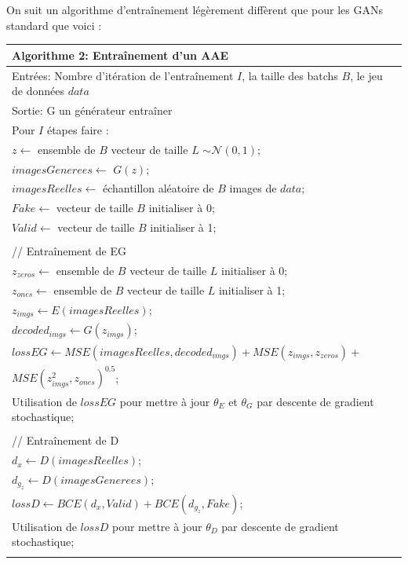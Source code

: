 \documentclass[11pt,francais]{article}
\begin{document}
On suit un algorithme d'entraînement légèrement diffèrent que pour les GANs standard que voici :\\
\newpage
\begin{table}[t!]
  \begin{tabular}{l}
  \hline
  Algorithme 2: Entraînement d'un AAE\tabularnewline
  \hline
  Entrées: Nombre d'itération de l'entraînement  \(I\), la taille des batchs \(B\), le jeu de données \(data\)  \tabularnewline
  Sortie: G un générateur entraîner \tabularnewline
  \hline
  Pour \(I\) étapes faire :\tabularnewline 
  \hspace{1cm}\(z \leftarrow\) ensemble de \(B\) vecteur de taille \(L\) \(\sim \mathcal{N}(0,1)\);\tabularnewline
  \hspace{1cm}\(imagesGenerees \leftarrow\) \(G(z)\);\tabularnewline  
  \hspace{1cm}\(imagesReelles \leftarrow\) échantillon aléatoire de \(B\) images de \(data\);\tabularnewline
  \hspace{1cm}\(Fake \leftarrow\) vecteur de taille \(B\) initialiser à 0;\tabularnewline
  \hspace{1cm}\(Valid \leftarrow\) vecteur de taille \(B\) initialiser à 1;\tabularnewline
  \tabularnewline
  
  \hspace{1cm}// Entraînement de EG\tabularnewline
  \hspace{1cm}\(z_{zeros} \leftarrow\) ensemble de \(B\) vecteur de taille \(L\) initialiser à 0;\tabularnewline
  \hspace{1cm}\(z_{ones} \leftarrow\) ensemble de \(B\) vecteur de taille \(L\) initialiser à 1;\tabularnewline
  \hspace{1cm}\(z_{imgs} \leftarrow E(imagesReelles)\);\tabularnewline
  \hspace{1cm}\(decoded_{imgs} \leftarrow G(z_{imgs})\);\tabularnewline
  \hspace{1cm}\(lossEG \leftarrow MSE(imagesReelles, decoded_{imgs}) + MSE(z_{imgs}, z_{zeros}) +\)\tabularnewline
  \hspace{2,8cm}\(MSE(z_{imgs}^2, z_{ones})^{0.5}\);\tabularnewline
  \hspace{1cm}Utilisation de \(lossEG\) pour mettre à jour \(\theta_E\) et \(\theta_G\) par descente de gradient stochastique;\tabularnewline
  \tabularnewline
  
  \hspace{1cm}// Entraînement de D\tabularnewline
  \hspace{1cm}\(d_x \leftarrow D(imagesReelles)\);\tabularnewline
  \hspace{1cm}\(d_{g_z} \leftarrow D(imagesGenerees)\);\tabularnewline
  \hspace{1cm}\(lossD \leftarrow BCE(d_x,Valid) + BCE(d_{g_z},Fake)\);\tabularnewline
  \hspace{1cm}Utilisation de \(lossD\) pour mettre à jour \(\theta_D\) par descente de gradient stochastique;\tabularnewline
  \tabularnewline
  

\end{tabular}
\end{table}
\end{document}
